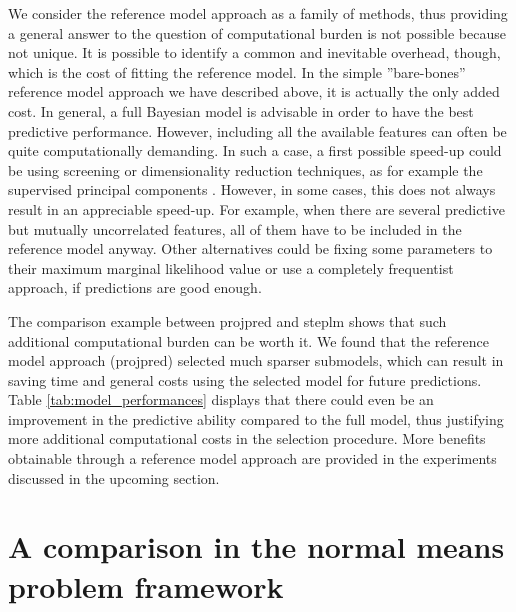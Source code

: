 \documentclass[american,]{article}
\theoremstyle{definition}
\begin{document}
We consider the reference model approach as a family of methods, thus providing a general answer to the question of computational burden is not possible because not unique. It is possible to identify a common and inevitable overhead, though, which is the cost of fitting the reference model. In the simple ''bare-bones'' reference model approach we have described above, it is actually the only added cost. In general, a full Bayesian model is advisable in order to have the best predictive performance. However, including all the available features can often be quite computationally demanding. In such a case, a first possible speed-up could be using screening or dimensionality reduction techniques, as for example the supervised principal components \citep{bair2006prediction,piironen2018}. However, in some cases, this does not always result in an appreciable speed-up. For example, when there are several predictive but mutually uncorrelated features, all of them  have to be included in the reference model anyway. Other alternatives could be fixing some parameters to their maximum marginal likelihood value \cite[typically referred as empirical Bayes;][]{casella1985introduction} or use a completely frequentist approach, if predictions are good enough.

The comparison example between projpred and steplm shows that such additional computational burden can be worth it. We found that the reference model approach (projpred) selected much sparser submodels, which can result in saving time and general costs using the selected model for future predictions. Table \ref{tab:model_performances} displays that there could even be an improvement in the predictive ability compared to the full model, thus justifying more additional computational costs in the selection procedure. More benefits obtainable through a reference model approach are provided in the experiments discussed in the upcoming section.


\hypertarget{comparison}{%
\section{A comparison in the normal means problem framework}\label{comparison}}
\end{document}
